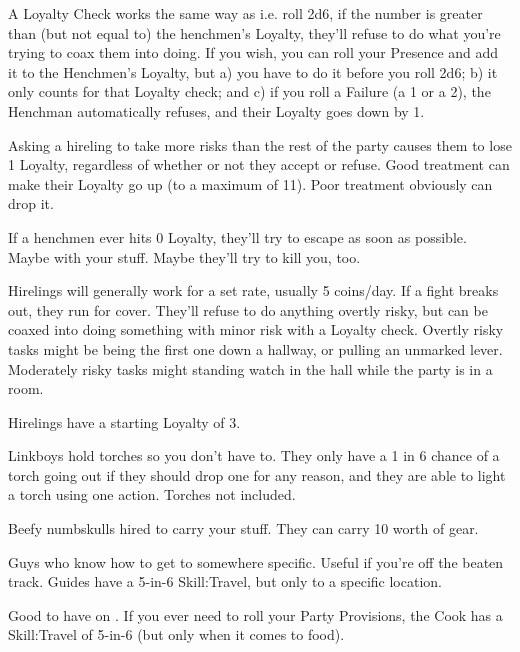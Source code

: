 {\begin{multicols}{2}
    A Loyalty Check works the same way as  i.e. roll 2d6, if the number is greater than (but not equal to) the henchmen's Loyalty, they'll refuse to do what you're trying to coax them into doing.  If you wish, you can roll your Presence \UD and add it to the Henchmen's Loyalty, but a) you have to do it before you roll 2d6; b) it only counts for that Loyalty check;  and c) if you roll a Failure (a 1 or a 2), the Henchman automatically refuses, and their Loyalty goes down by 1.

    Asking a hireling to take more risks than the rest of the party causes them to lose 1 Loyalty, regardless of whether or not they accept or refuse. Good treatment can make their Loyalty go up (to a maximum of 11).  Poor treatment obviously can drop it.

    If a henchmen ever hits 0 Loyalty, they'll try to escape as soon as possible.  Maybe with your stuff.  Maybe they'll try to kill you, too.



    Hirelings will generally work for a set rate, usually 5 coins/day.  If a fight breaks out, they run for cover. They'll refuse to do anything overtly risky, but can be coaxed into doing something with minor risk with a Loyalty check.  Overtly risky tasks might be being the first one down a hallway, or pulling an unmarked lever. Moderately risky tasks might standing watch in the hall while the party is in a room.

    Hirelings have a starting Loyalty of 3.

    Linkboys hold torches so you don't have to. They only have a 1 in 6 chance of a torch going out if they should drop one for any reason, and they are able to light a torch using one action.  Torches not included.

    Beefy numbskulls hired to carry your stuff. They can carry 10  worth of gear.

    Guys who know how to get to somewhere specific. Useful if you're  off the beaten track. Guides have a 5-in-6 Skill:Travel, but only to a specific location.

    Good to have on .  If you ever need to roll your Party Provisions, the Cook has a Skill:Travel of 5-in-6 (but only when it comes to food).


\end{multicols}}
